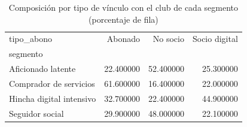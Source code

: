 \begin{table}
\caption{Composición por tipo de vínculo con el club de cada segmento (porcentaje de fila)}
\label{tab:segmentos_abono}
\begin{tabular}{lrrr}
\toprule
tipo\_abono & Abonado & No socio & Socio digital \\
segmento &  &  &  \\
\midrule
Aficionado latente & 22.400000 & 52.400000 & 25.300000 \\
Comprador de servicios & 61.600000 & 16.400000 & 22.000000 \\
Hincha digital intensivo & 32.700000 & 22.400000 & 44.900000 \\
Seguidor social & 29.900000 & 48.000000 & 22.100000 \\
\bottomrule
\end{tabular}
\end{table}

